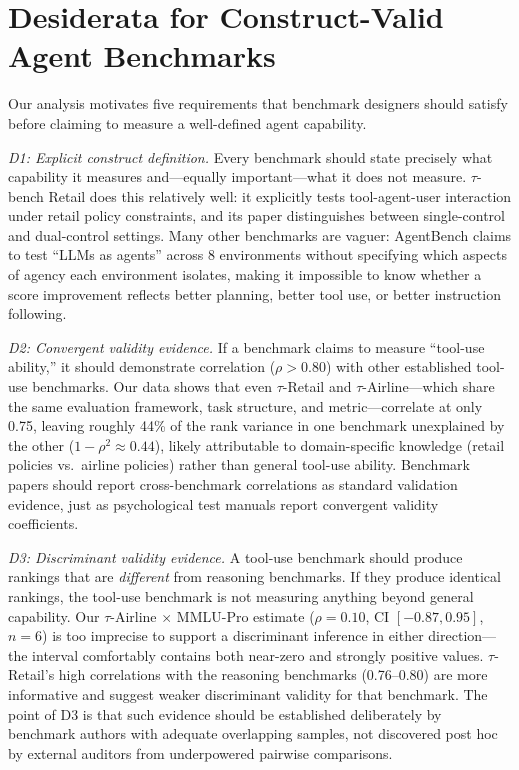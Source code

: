 \documentclass[11pt]{article}
\begin{document}
\section{Desiderata for Construct-Valid Agent Benchmarks}\label{sec:desiderata}
Our analysis motivates five requirements that benchmark designers should satisfy before claiming to measure a well-defined agent capability.

\textit{D1: Explicit construct definition.} Every benchmark should state precisely what capability it measures and---equally important---what it does not measure. $\tau$-bench Retail does this relatively well: it explicitly tests tool-agent-user interaction under retail policy constraints, and its paper distinguishes between single-control and dual-control settings. Many other benchmarks are vaguer: AgentBench claims to test ``LLMs as agents'' across 8 environments without specifying which aspects of agency each environment isolates, making it impossible to know whether a score improvement reflects better planning, better tool use, or better instruction following.

\textit{D2: Convergent validity evidence.} If a benchmark claims to measure ``tool-use ability,'' it should demonstrate correlation ($\rho > 0.80$) with other established tool-use benchmarks. Our data shows that even $\tau$-Retail and $\tau$-Airline---which share the same evaluation framework, task structure, and metric---correlate at only 0.75, leaving roughly 44\% of the rank variance in one benchmark unexplained by the other ($1 - \rho^2 \approx 0.44$), likely attributable to domain-specific knowledge (retail policies vs.\ airline policies) rather than general tool-use ability. Benchmark papers should report cross-benchmark correlations as standard validation evidence, just as psychological test manuals report convergent validity coefficients.

\textit{D3: Discriminant validity evidence.} A tool-use benchmark should produce rankings that are \emph{different} from reasoning benchmarks. If they produce identical rankings, the tool-use benchmark is not measuring anything beyond general capability. Our $\tau$-Airline $\times$ MMLU-Pro estimate ($\rho = 0.10$, CI $[-0.87, 0.95]$, $n = 6$) is too imprecise to support a discriminant inference in either direction---the interval comfortably contains both near-zero and strongly positive values. $\tau$-Retail's high correlations with the reasoning benchmarks (0.76--0.80) are more informative and suggest weaker discriminant validity for that benchmark. The point of D3 is that such evidence should be established deliberately by benchmark authors with adequate overlapping samples, not discovered post hoc by external auditors from underpowered pairwise comparisons.
\end{document}
